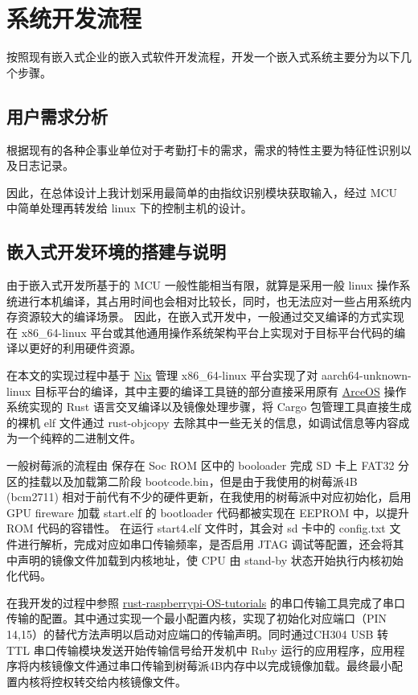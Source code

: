 \section{系统开发流程}

    按照现有嵌入式企业的嵌入式软件开发流程，开发一个嵌入式系统主要分为以下几个步骤。

\subsection{用户需求分析}

    根据现有的各种企事业单位对于考勤打卡的需求，需求的特性主要为特征性识别以及日志记录。
    
    因此，在总体设计上我计划采用最简单的由指纹识别模块获取输入，经过 MCU 中简单处理再转发给
    linux 下的控制主机的设计。

\subsection{嵌入式开发环境的搭建与说明}

    由于嵌入式开发所基于的 MCU 一般性能相当有限，就算是采用一般 linux 操作系统进行本机编译，其占用时间也会相对比较长，同时，也无法应对一些占用系统内存资源较大的编译场景。
    因此，在嵌入式开发中，一般通过交叉编译的方式实现在 x86\_64-linux 平台或其他通用操作系统架构平台上实现对于目标平台代码的编译以更好的利用硬件资源。

    在本文的实现过程中基于 \href{https://nixos.org/}{Nix} 管理 x86\_64-linux 平台实现了对 aarch64-unknown-linux 目标平台的编译，其中主要的编译工具链的部分直接采用原有 \href{https://github.com/rcore-os/arceos}{ArceOS} 操作系统实现的 Rust 语言交叉编译以及镜像处理步骤，将 Cargo 包管理工具直接生成的裸机 elf 文件通过 rust-objcopy 去除其中一些无关的信息，如调试信息等内容成为一个纯粹的二进制文件。 
  
    一般树莓派的流程由 保存在 Soc ROM 区中的 booloader 完成 SD 卡上 FAT32 分区的挂载以及加载第二阶段 bootcode.bin，但是由于我使用的树莓派4B (bcm2711) 相对于前代有不少的硬件更新，在我使用的树莓派中对应初始化，启用 GPU fireware 加载 start.elf 的 bootloader 代码都被实现在 EEPROM 中，以提升 ROM 代码的容错性。 
    在运行 start4.elf 文件时，其会对 sd 卡中的 config.txt 文件进行解析，完成对应如串口传输频率，是否启用 JTAG 调试等配置，还会将其中声明的镜像文件加载到内核地址，使 CPU 由 stand-by 状态开始执行内核初始化代码。

    在我开发的过程中参照 \href{https://github.com/rust-embedded/rust-raspberrypi-OS-tutorials}{rust-raspberrypi-OS-tutorials} 的串口传输工具完成了串口传输的配置。其中通过实现一个最小配置内核，实现了初始化对应端口（PIN 14,15）的替代方法声明以启动对应端口的传输声明。同时通过CH304 USB 转 TTL 串口传输模块发送开始传输信号给开发机中 Ruby 运行的应用程序，应用程序将内核镜像文件通过串口传输到树莓派4B内存中以完成镜像加载。最终最小配置内核将控权转交给内核镜像文件。

